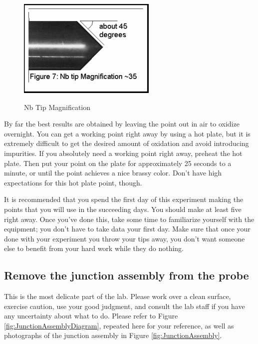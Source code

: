 \documentclass{../lab}
\begin{document}
\begin{figure}[h]
    \centering
    \href{http://experimentationlab.berkeley.edu/sites/default/files/images/250px-JOS11b.gif}{\includegraphics[width=0.5\linewidth]{images/250px-JOS11b.png}}
    \caption{Nb Tip Magnification}
    \label{fig:NbTipMagnification}
\end{figure}
 
By far the best results are obtained by leaving the point out in air to oxidize overnight. You can get a working point right away by using a hot plate, but it is extremely difficult to get the desired amount of oxidation and avoid introducing impurities. If you absolutely need a working point right away, preheat the hot plate. Then put your point on the plate for approximately 25 seconds to a minute, or until the point achieves a nice brassy color. Don't have high expectations for this hot plate point, though.

It is recommended that you spend the first day of this experiment making the points that you will use in the succeeding days. You should make at least five right away. Once you've done this, take some time to familiarize yourself with the equipment; you don't have to take data your first day. Make sure that once your done with your experiment you throw your tips away, you don't want someone else to benefit from your hard work while they do nothing.

\subsection{Remove the junction assembly from the probe}

This is the most delicate part of the lab. Please work over a clean surface, exercise caution, use your good judgment, and consult the lab staff if you have any uncertainty about what to do. Please refer to Figure \ref{fig:JunctionAssemblyDiagram}, repeated here for your reference, as well as photographs of the junction assembly in Figure \ref{fig:JunctionAssembly}.
\end{document}
